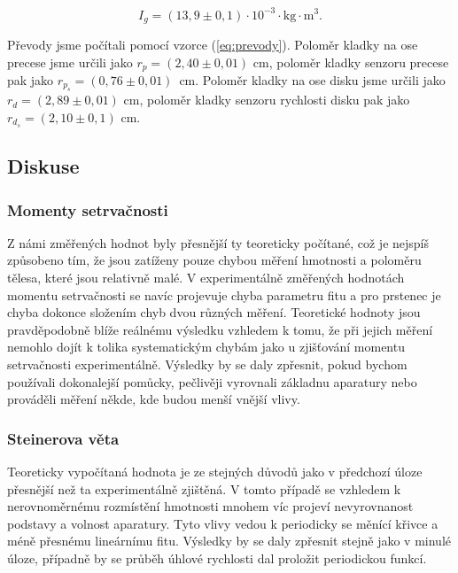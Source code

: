 \documentclass[english]{article}
\newcommand{\unit}[1]{\mathrm{#1}}
\begin{document}
		\begin{equation}
			I_{g} = (13,9\pm0,1) \cdot \unit{10^{-3} \cdot kg \cdot m^3}.
		\end{equation}		
		
		Převody jsme počítali pomocí vzorce (\ref{eq:prevody}). Poloměr kladky na ose precese jsme určili jako $r_p = (2,40\pm0,01)$ cm, poloměr kladky senzoru precese pak jako $r_{p_s} = (0,76\pm0,01)$\ cm. Poloměr kladky na ose disku jsme určili jako $r_d = (2,89\pm0,01)$ cm, poloměr kladky senzoru rychlosti disku pak jako $r_{d_s} = (2,10\pm0,1)$ cm. 
	
\subsection{Diskuse}
	\subsubsection{Momenty setrvačnosti}
		Z námi změřených hodnot byly přesnější ty teoreticky počítané, což je nejspíš způsobeno tím, že jsou zatíženy pouze chybou měření hmotnosti a poloměru tělesa, které jsou relativně malé. V experimentálně změřených hodnotách momentu setrvačnosti se navíc projevuje chyba parametru fitu a pro prstenec je chyba dokonce složením chyb dvou různých měření. Teoretické hodnoty jsou pravděpodobně blíže reálnému výsledku vzhledem k tomu, že při jejich měření nemohlo dojít k tolika systematickým chybám jako u zjišťování momentu setrvačnosti experimentálně. Výsledky by se daly zpřesnit, pokud bychom používali dokonalejší pomůcky, pečlivěji vyrovnali základnu aparatury nebo prováděli měření někde, kde budou menší vnější vlivy.
			
	\subsubsection{Steinerova věta}
		Teoreticky vypočítaná hodnota je ze stejných důvodů jako v předchozí úloze přesnější než ta experimentálně zjištěná. V tomto případě se vzhledem k nerovnoměrnému rozmístění hmotnosti mnohem víc projeví nevyrovnanost podstavy a volnost aparatury. Tyto vlivy vedou k periodicky se měnící křivce a méně přesnému lineárnímu fitu. Výsledky by se daly zpřesnit stejně jako v minulé úloze, případně by se průběh úhlové rychlosti dal proložit periodickou funkcí.
		
\end{document}
